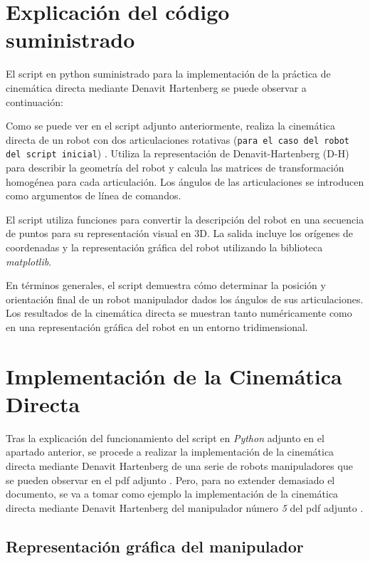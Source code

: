 \documentclass[11pt]{report}
\begin{document}
\section{Explicación del código suministrado}

El script en python suministrado para la implementación de la práctica de cinemática directa mediante Denavit Hartenberg se puede observar a continuación: 



Como se puede ver en el script adjunto anteriormente, realiza la cinemática directa de un robot con dos articulaciones rotativas (\texttt{para el caso del robot del script inicial}) . Utiliza la representación de Denavit-Hartenberg (D-H) para describir la geometría del robot y calcula las matrices de transformación homogénea para cada articulación. Los ángulos de las articulaciones se introducen como argumentos de línea de comandos.

El script utiliza funciones para convertir la descripción del robot en una secuencia de puntos para su representación visual en 3D. La salida incluye los orígenes de coordenadas y la representación gráfica del robot utilizando la biblioteca \emph{matplotlib}.

En términos generales, el script demuestra cómo determinar la posición y orientación final de un robot manipulador dados los ángulos de sus articulaciones. Los resultados de la cinemática directa se muestran tanto numéricamente como en una representación gráfica del robot en un entorno tridimensional.

\section{Implementación de la Cinemática Directa}

Tras la explicación del funcionamiento del script en \emph{Python} adjunto en el apartado anterior, se procede a realizar la implementación de la cinemática directa mediante Denavit Hartenberg de una serie de robots manipuladores que se pueden observar en el pdf adjunto \cite{5}. Pero, para no extender demasiado el documento, se va a tomar como ejemplo la implementación de la cinemática directa mediante Denavit Hartenberg del manipulador número \emph{5} del pdf adjunto \cite{5}.

\subsection{Representación gráfica del manipulador}
\end{document}
